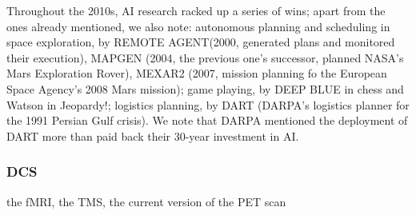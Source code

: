 \documentclass[../main.tex]{subfiles}
\begin{document}
\vspace{4pt}
Throughout the 2010s, AI research racked up a series of wins; apart from the ones already mentioned, we also note: autonomous planning and scheduling in space exploration, by REMOTE AGENT(2000, generated plans and monitored their execution), MAPGEN (2004, the previous one's successor, planned NASA's Mars Exploration Rover), MEXAR2 (2007, mission planning fo the European Space Agency's 2008 Mars mission); game playing, by DEEP BLUE in chess and Watson in Jeopardy!; logistics planning, by DART (DARPA's logistics planner for the 1991 Persian Gulf crisis). We note that DARPA mentioned the deployment of DART more than paid back their 30-year investment in AI.

\subsubsection{DCS}


the fMRI, the TMS, the current version of the PET scan
\end{document}

